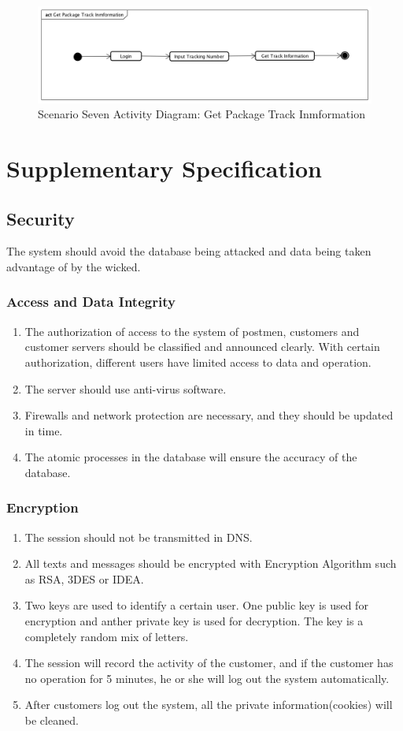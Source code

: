 \documentclass[12pt]{scrreprt}
\begin{document}
\begin{figure}[H]
  \centering\includegraphics[width=5in]{DocumentRes/8GetPackageTrackInmformation.png}
  \caption{Scenario Seven Activity Diagram: Get Package Track Inmformation}
\end{figure}

\section{Supplementary Specification}
\subsection{Security}
The system should avoid the database being attacked and data being taken
advantage of by the wicked.
\subsubsection{Access and Data Integrity}
\begin{enumerate}
  \item The authorization of access to the system of postmen, customers
  and customer servers should be classified and announced clearly. With
  certain authorization, different users have limited access to data and
  operation.
  \item The server should use anti-virus software.
  \item Firewalls and network protection are necessary, and they should
  be updated in time.
  \item The atomic processes in the database will ensure the accuracy
  of the database.
\end{enumerate}

\subsubsection{Encryption}
\begin{enumerate}
  \item The session should not be transmitted in DNS.
  \item All texts and messages should be encrypted with Encryption Algorithm
  such as RSA, 3DES or IDEA.
  \item Two keys are used to identify a certain user. One public key is
  used for encryption and anther private key is used for decryption.
  The key is a completely random mix of letters.
  \item The session will record the activity of the customer, and if the
  customer has no operation for 5 minutes, he or she will log out the system
  automatically.
  \item After customers log out the system, all the private information(cookies)
  will be cleaned.
\end{enumerate}
\end{document}

